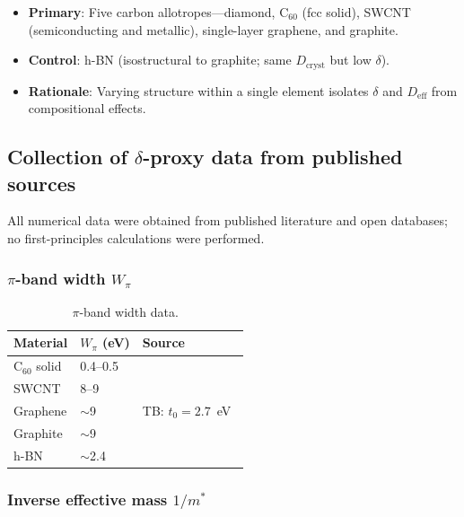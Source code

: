 \documentclass[twocolumn,showpacs,preprintnumbers,amsmath,amssymb,prb]{revtex4-2}
\begin{document}
\begin{itemize}
  \item \textbf{Primary}: Five carbon allotropes---diamond,
    C$_{60}$ (fcc solid), SWCNT (semiconducting and metallic),
    single-layer graphene, and graphite.
  \item \textbf{Control}: h-BN (isostructural to graphite; same
    $D_\mathrm{cryst}$ but low $\delta$).
  \item \textbf{Rationale}: Varying structure within a single element
    isolates $\delta$ and $D_\mathrm{eff}$ from compositional effects.
\end{itemize}

\subsection{Collection of $\delta$-proxy data from published sources}

All numerical data were obtained from published literature and open
databases; no first-principles calculations were performed.

\subsubsection{$\pi$-band width $W_\pi$}

\begin{table}[h]
\caption{$\pi$-band width data.}
\label{tab:bandwidth}
\begin{ruledtabular}
\begin{tabular}{lll}
  Material & $W_\pi$ (eV) & Source \\
  \hline
  C$_{60}$ solid & 0.4--0.5 & \cite{Gunnarsson1997} \\
  SWCNT & 8--9 & \cite{Reich2002} \\
  Graphene & $\sim$9 & TB: $t_0 = 2.7$~eV~\cite{Saito1998} \\
  Graphite & $\sim$9 & \cite{Reich2002} \\
  h-BN & $\sim$2.4 & \cite{Wirtz2005} \\
\end{tabular}
\end{ruledtabular}
\end{table}

\subsubsection{Inverse effective mass $1/m^*$}
\end{document}
